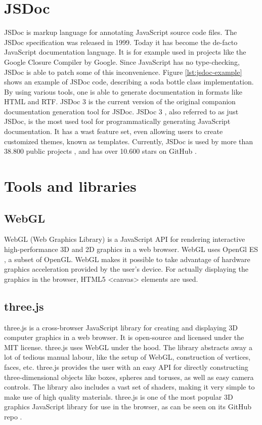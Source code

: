 \section{JSDoc}
JSDoc is markup language for annotating JavaScript source code files. The JSDoc specification was released in 1999. Today it has become the de-facto JavaScript documentation language. It is for example used in projects like the Google Closure Compiler \cite{google-closure-compiler} by Google. Since JavaScript has no type-checking, JSDoc is able to patch some of this inconvenience. Figure \ref{lst:jsdoc-example} shows an example of JSDoc code, describing a soda bottle class implementation. By using various tools, one is able to generate documentation in formats like HTML and RTF. JSDoc 3 is the current version of the original companion documentation generation tool for JSDoc. JSDoc 3 \cite{jsdoc-3}, also referred to as just JSDoc, is the most used tool for programmatically generating JavaScript documentation. It has a wast feature set, even allowing users to create customized themes, known as templates. Currently, JSDoc is used by more than 38.800 public projects \cite{jsdoc-used-by}, and has over 10.600 stars on GitHub \cite{jsdoc-stargazers}.




\section{Tools and libraries}
\subsection{WebGL}
WebGL (Web Graphics Library) \cite{webgl} is a JavaScript API for rendering interactive high-performance 3D and 2D graphics in a web browser. WebGL uses OpenGl ES \cite{opengl-es}, a subset of OpenGL. WebGL makes it possible to take advantage of hardware graphics acceleration provided by the user's device. For actually displaying the graphics in the browser, HTML5 <canvas> elements are used. 

\subsection{three.js}
three.js\cite{three.js} is a cross-browser JavaScript library for creating and displaying 3D computer graphics in a web browser. It is open-source and licensed under the MIT license. three.js uses WebGL under the hood. The library abstracts away a lot of tedious manual labour, like the setup of WebGL, construction of vertices, faces, etc. three.js provides the user with an easy API for directly constructing three-dimensional objects like boxes, spheres and toruses, as well as easy camera controls. The library also includes a vast set of shaders, making it very simple to make use of high quality materials. three.js is one of the most popular 3D graphics JavaScript library for use in the browser, as can be seen on its GitHub repo \cite{three.js}.

